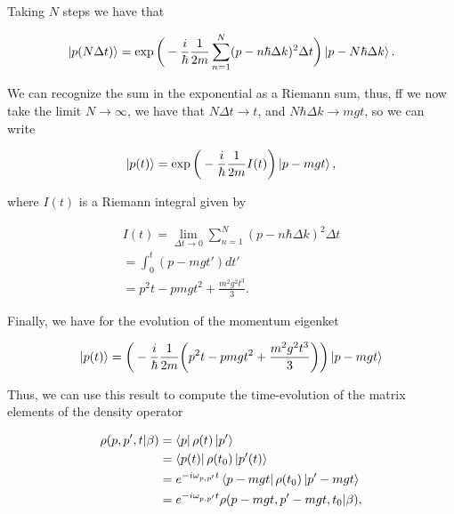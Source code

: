\documentclass{article}
\begin{document}
Taking $N$ steps we have that

\begin{equation}
    \ket{p(N \Delta t)} = \exp \bigg(-\frac{i}{\hbar} \frac{1}{2m} \sum_{n=1}^{N} (p- n\hbar \Delta k)^{2} \Delta t \bigg) \ket{p-N\hbar \Delta k}.
\end{equation}

We can recognize the sum in the exponential as a Riemann sum, thus, ff we now take the limit $N \longrightarrow \infty$, we have that $N \Delta t \longrightarrow t$, and $N\hbar \Delta k \longrightarrow mgt$, so we can write

\begin{equation}
    \ket{p(t)} = \exp \bigg(- \frac{i}{\hbar} \frac{1}{2m} I(t) \bigg) \ket{p-mgt},
\end{equation}

where $I(t)$ is a Riemann integral given by

\begin{equation}
    \begin{split}
        I(t) = \lim_{\Delta t \to 0} \sum_{n=1}^{N} (p- n\hbar \Delta k)^{2} \Delta t \\ = \int_{0}^{t}(p-mgt')dt' \\ = p^{2}t - pmgt^{2} + \frac{m^{2} g^{2} t^{3}}{3}.
    \end{split}
\end{equation}

Finally, we have for the evolution of the momentum eigenket

\begin{equation}
    \ket{p(t)} = \bigg( -\frac{i}{\hbar} \frac{1}{2m} \bigg(p^{2}t - pmgt^{2} + \frac{m^{2} g^{2} t^{3}}{3}\bigg) \bigg) \ket{p -mgt}
\end{equation}

Thus, we can use this result to compute the time-evolution of the matrix elements of the density operator

\begin{equation}\label{time_evo_density_op_free_fall_H}
    \begin{aligned}
        \rho(p,p',t|\beta) & = \bra{p} \rho (t) \ket{p'} \\ & = \bra{p(t)} \rho (t_{0}) \ket{p'(t)} \\ & = e^{-i\omega_{p,p'} t} \bra{p-mgt} \rho(t_{0}) \ket{p'-mgt} \\ & = e^{-i\omega_{p,p'} t} \rho (p-mgt, p'-mgt,t_{0}|\beta),
    \end{aligned}
\end{equation}
\end{document}
